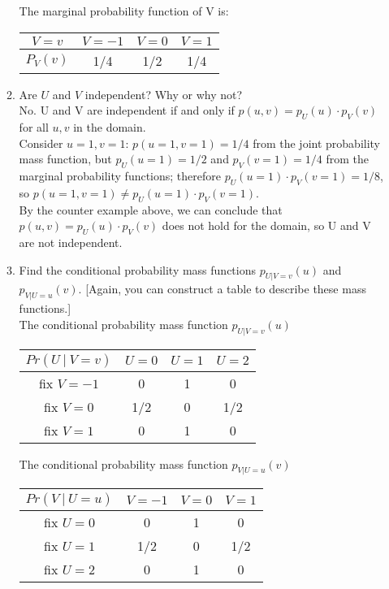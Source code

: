\documentclass[11pt]{article}
\begin{document}
\begin{enumerate}[label=\textbf{Question \arabic*:},start=1]
\begin{enumerate}
	The marginal probability function of V is:
\begin{center}
 \begin{tabular}{|| c c c c ||} 
 \hline
 $V=v$ & $V=-1$ & $V=0$ & $V=1$ \\ [0.5ex] 
 \hline\hline
 $P_{V}(v)$ & 1/4 & 1/2 & 1/4  \\ 
 \hline
\end{tabular}
\end{center}

	\item Are $U$ and $V$ independent? Why or why not?\\
	
	No. U and V are independent if and only if $p(u,v) = p_U(u) \cdot p_V(v)$ for all $u, v$ in the domain. \\
	
	Consider $u=1, v=1$: $p(u=1, v=1) = 1/4$ from the joint probability mass function, but $p_U(u=1) = 1/2$ and $p_V(v=1) = 1/4$ from the marginal probability functions; therefore $p_U(u=1) \cdot p_V(v=1) = 1/8$, so $p(u = 1, v = 1) \neq p_U(u=1) \cdot p_V(v=1) $. \\
	
	By the counter example above, we can conclude that $p(u, v) = p_U(u) \cdot p_V(v)$ does not hold for the domain, so U and V are not independent.\\
	

	\item Find the conditional probability mass functions $p_{U|V = v}(u)$ and $p_{V|U=u}(v)$. [Again, you can construct a table to describe these mass functions.]\\
	
	The conditional probability mass function $p_{U | V=v}(u)$
\begin{center}
 \begin{tabular}{|| c c c c ||} 
 \hline
 $Pr(U\ | \ V= v)$ & $U=0$ & $U=1$ & $U=2$ \\ [0.5ex] 
 \hline\hline
 fix $V=-1$ & 0 & 1 & 0  \\ 
 \hline
 fix $V=0$ & 1/2 & 0 & 1/2  \\
 \hline
 fix $V=1$ & 0 & 1 & 0 \\
 \hline
\end{tabular}
\end{center}

	The conditional probability mass function $p_{V | U=u}(v)$
\begin{center}
 \begin{tabular}{|| c c c c ||} 
 \hline
 $Pr(V\ | \ U= u)$ & $V=-1$ & $V=0$ & $V=1$ \\ [0.5ex] 
 \hline\hline
 fix $U=0$ & 0 & 1 & 0  \\ 
 \hline
 fix $U=1$ & 1/2 & 0 & 1/2  \\
 \hline
 fix $U=2$ & 0 & 1 & 0 \\
 \hline
\end{tabular}
\end{center}


\end{enumerate}
\end{enumerate}
\end{document}
